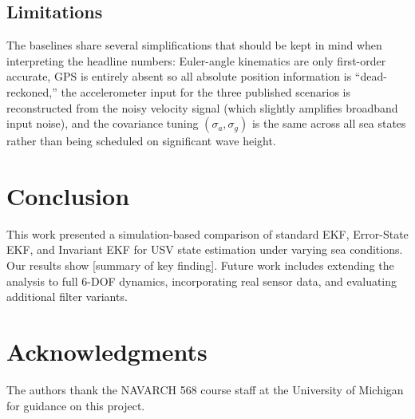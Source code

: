 \documentclass[conference]{IEEEtran}
\begin{document}
\subsection{Limitations}

The baselines share several simplifications that should be kept in mind when interpreting the headline numbers: Euler-angle kinematics are only first-order accurate, GPS is entirely absent so all absolute position information is ``dead-reckoned,'' the accelerometer input for the three published scenarios is reconstructed from the noisy velocity signal (which slightly amplifies broadband input noise), and the covariance tuning $(\sigma_a, \sigma_g)$ is the same across all sea states rather than being scheduled on significant wave height.

\section{Conclusion}
\label{sec:conclusion}


This work presented a simulation-based comparison of standard EKF, Error-State EKF, and Invariant EKF for USV state estimation under varying sea conditions. Our results show [summary of key finding]. Future work includes extending the analysis to full 6-DOF dynamics, incorporating real sensor data, and evaluating additional filter variants.

\section*{Acknowledgments}

The authors thank the NAVARCH 568 course staff at the University of Michigan for guidance on this project.
\end{document}
